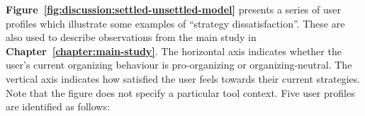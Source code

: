 \textbf{Figure~\ref{fig:discussion:settled-unsettled-model}} presents a series of user profiles which illustrate some examples of ``strategy dissatisfaction''. These are also used to describe observations from the main study in \textbf{Chapter~\ref{chapter:main-study}}.  The horizontal axis indicates whether the user's current organizing behaviour is pro-organizing or organizing-neutral. The vertical axis indicates how satisfied the user feels towards their current strategies.  Note that the figure does not specify a particular tool context.  Five user profiles are identified as follows:
